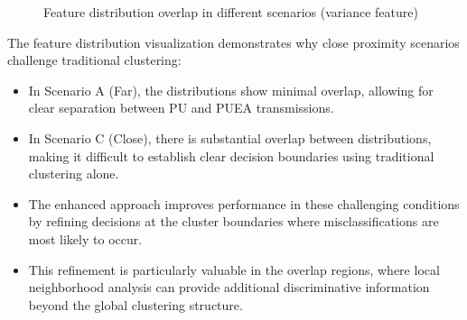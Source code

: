 \begin{figure}[htbp]
    \centering
    \caption{Feature distribution overlap in different scenarios (variance feature)}
    \label{fig:feature_distributions}
\end{figure}

The feature distribution visualization demonstrates why close proximity scenarios challenge traditional clustering:

\begin{itemize}
    \item In Scenario A (Far), the distributions show minimal overlap, allowing for clear separation between PU and PUEA transmissions.
    
    \item In Scenario C (Close), there is substantial overlap between distributions, making it difficult to establish clear decision boundaries using traditional clustering alone.
    
    \item The enhanced approach improves performance in these challenging conditions by refining decisions at the cluster boundaries where misclassifications are most likely to occur.
    
    \item This refinement is particularly valuable in the overlap regions, where local neighborhood analysis can provide additional discriminative information beyond the global clustering structure.
\end{itemize}

